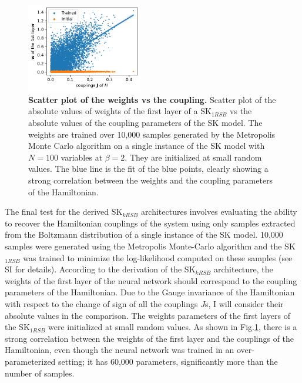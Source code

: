 \documentclass[aps,physrev,10pt,floatfix,reprint]{revtex4-2}
\begin{document}
\begin{figure}[h]
    \centering 
    \includegraphics[width=0.45\textwidth]{img/MC_img.pdf}
    \caption{\textbf{Scatter plot of the weights vs the coupling.} Scatter plot of the absolute values of weights of the first layer of a SK$_{1RSB}$ vs the absolute values of the coupling parameters of the SK model. The weights are trained over 10,000 samples generated by the Metropolis Monte Carlo algorithm on a single instance of the SK model with $N=100$ variables at $\beta=2$. They are initialized at small random values. The blue line is the fit of the blue points, clearly showing a strong correlation between the weights and the coupling parameters of the Hamiltonian.}
    \label{fig:SK_MC}
\end{figure}

The final test for the derived SK$_{kRSB}$ architectures involves evaluating the ability to recover the Hamiltonian couplings of the system using only samples extracted from the Boltzmann distribution of a single instance of the SK model. 10,000 samples were generated using the Metropolis Monte-Carlo algorithm and the SK$_{1RSB}$ was trained to minimize the log-likelihood computed on these samples (see SI for details). According to the derivation of the SK$_{kRSB}$ architecture, the weights of the first layer of the neural network should correspond to the coupling parameters of the Hamiltonian. Due to the Gauge invariance of the Hamiltonian with respect to the change of sign of all the couplings $J$s, I will consider their absolute values in the comparison. The weights parameters of the first layers of the SK$_{1RSB}$ were initialized at small random values. As shown in Fig.\ref{fig:SK_MC}, there is a strong correlation between the weights of the first layer and the couplings of the Hamiltonian, even though the neural network was trained in an over-parameterized setting; it has 60,000 parameters, significantly more than the number of samples.
\end{document}
